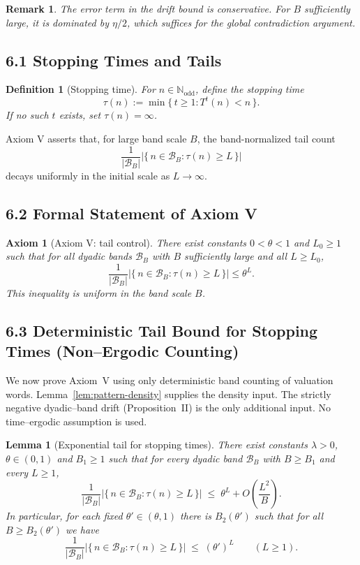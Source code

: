 \documentclass[preprint,12pt]{elsarticle}
\newtheorem{remark}{Remark}
\newtheorem{lemma}{Lemma}
\newtheorem{definition}{Definition}
\newtheorem{axiom}{Axiom}
\begin{document}
\begin{remark}
The error term in the drift bound is conservative. For $B$ sufficiently large,
it is dominated by $\eta/2$, which suffices for the global contradiction
argument.
\end{remark}

\subsection{6.1 Stopping Times and Tails}
\begin{definition}[Stopping time]
For $n \in \mathbb{N}_{\mathrm{odd}}$, define the stopping time
\[
\tau(n) := \min\{\, t \ge 1 : T^t(n) < n \,\}.
\]
If no such $t$ exists, set $\tau(n)=\infty$.
\end{definition}
Axiom V asserts that, for large band scale $B$, the band-normalized tail count
\[
\frac{1}{|\mathcal{B}_B|}\Big|\{\, n\in\mathcal{B}_B : \tau(n) \ge L \,\}\Big|
\]
decays uniformly in the initial scale as $L\to\infty$.

\subsection{6.2 Formal Statement of Axiom V}
\begin{axiom}[Axiom V: tail control]
There exist constants $0<\theta<1$ and $L_0\ge 1$ such that for all dyadic bands $\mathcal{B}_B$ with $B$ sufficiently large and all $L \ge L_0$,
\[
\frac{1}{|\mathcal{B}_B|}\Big|\{\, n\in\mathcal{B}_B : \tau(n) \ge L \,\}\Big| \le \theta^{L}.
\]
This inequality is uniform in the band scale $B$.
\end{axiom}

\subsection{6.3 Deterministic Tail Bound for Stopping Times (Non--Ergodic Counting)}
We now prove Axiom~V using only deterministic band counting of valuation words.
Lemma~\ref{lem:pattern-density} supplies the density input. The strictly negative
dyadic--band drift (Proposition~II) is the only additional input. No time--ergodic
assumption is used.

\begin{lemma}[Exponential tail for stopping times]
\label{lem:tau-tail-counting}
There exist constants $\lambda>0$, $\theta\in(0,1)$ and $B_1\ge 1$ such that
for every dyadic band $\mathcal{B}_B$ with $B\ge B_1$ and every $L\ge 1$,
\[
\frac{1}{|\mathcal{B}_B|}\Big|\{\,n\in\mathcal{B}_B:\tau(n)\ge L\,\}\Big|
\;\le\; \theta^{L} + O\!\left(\frac{L^2}{B}\right).
\]
In particular, for each fixed $\theta'\in(\theta,1)$ there is $B_2(\theta')$ such
that for all $B\ge B_2(\theta')$ we have
\[
\frac{1}{|\mathcal{B}_B|}\Big|\{\,n\in\mathcal{B}_B:\tau(n)\ge L\,\}\Big|
\;\le\; (\theta')^{L}\qquad (L\ge 1).
\]
\end{lemma}
\end{document}
